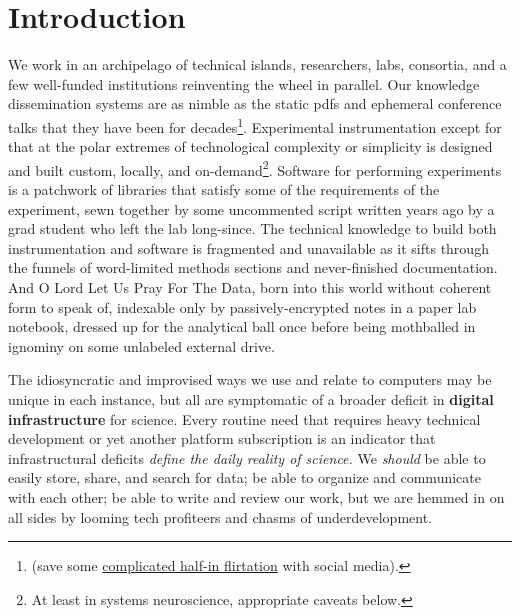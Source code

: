 \documentclass[10pt]{article}
\begin{document}
\hypertarget{introduction}{%
\section{Introduction}\label{introduction}}


\begin{multicols}{2}
 We work in an archipelago of technical islands,
researchers, labs, consortia, and a few well-funded institutions
reinventing the wheel in parallel. Our knowledge dissemination systems
are as nimble as the static pdfs and ephemeral conference talks that
they have been for decades\footnote{(save some
  \protect\hyperlink{forums-are-just-one-point-in-a-continuous-feature-space-of-commu}{complicated
  half-in flirtation} with social media).}. Experimental instrumentation
except for that at the polar extremes of technological complexity or
simplicity is designed and built custom, locally, and
on-demand\footnote{At least in systems neuroscience, appropriate caveats
  below.}. Software for performing experiments is a patchwork of
libraries that satisfy some of the requirements of the experiment, sewn
together by some uncommented script written years ago by a grad student
who left the lab long-since. The technical knowledge to build both
instrumentation and software is fragmented and unavailable as it sifts
through the funnels of word-limited methods sections and never-finished
documentation. And O Lord Let Us Pray For The Data, born into this world
without coherent form to speak of, indexable only by passively-encrypted
notes in a paper lab notebook, dressed up for the analytical ball once
before being mothballed in ignominy on some unlabeled external drive.

The idiosyncratic and improvised ways we use and relate to computers may
be unique in each instance, but all are symptomatic of a broader deficit
in \textbf{digital infrastructure} for science. Every routine need that
requires heavy technical development or yet another platform
subscription is an indicator that infrastructural deficits \emph{define
the daily reality of science.} We \emph{should} be able to easily store,
share, and search for data; be able to organize and communicate with
each other; be able to write and review our work, but we are hemmed in
on all sides by looming tech profiteers and chasms of underdevelopment.


\end{multicols}
\end{document}
